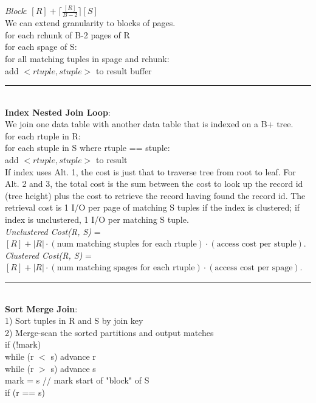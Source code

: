 \documentclass[10pt,landscape]{article}
\newcommand{\ruler}{\\\rule{\columnwidth}{0.25pt}\\}
\begin{document}
\begin{multicols*}{3}
\textit{Block}: $[R] + \lceil\frac{[R]}{B-2}\rceil[S]$\\
We can extend granularity to blocks of pages.\\
for each rchunk of B-2 pages of R\\
\-\hspace{0.5cm} for each spage of S:\\
\-\hspace{1.0cm} for all matching tuples in spage and rchunk:\\
\-\hspace{1.5cm} add $<rtuple, stuple>$ to result buffer
\ruler
\textbf{Index Nested Join Loop}:\\
We join one data table with another data table that is indexed on a B+ tree.\\
for each rtuple in R:\\
\-\hspace{0.5cm} for each stuple in S where rtuple == stuple:\\
\-\hspace{1.0cm} add $<rtuple, stuple>$ to result\\
If index uses Alt. 1, the  cost is just that to traverse tree from root to leaf. For Alt. 2 and 3, the total cost is the sum between the cost to look up the record id (tree height) plus the cost to retrieve the record having found the record id. The retrieval cost is 1 I/O per page of matching S tuples if the index is clustered; if index is unclustered, 1 I/O per matching S tuple. \\
\textit{Unclustered Cost(R, S)} = $[R] + |R| \cdot (\text{num matching stuples for each rtuple}) \cdot (\text{access cost per stuple})$.
\textit{Clustered Cost(R, S)} = $[R] + |R| \cdot (\text{num matching spages for each rtuple}) \cdot (\text{access cost per spage})$.
\ruler
\textbf{Sort Merge Join}:\\
1) Sort tuples in R and S by join key\\
2) Merge-scan the sorted partitions and output matches\\
if (!mark)\\
\-\hspace{0.5cm} while (r $<$ s) advance r \\
\-\hspace{0.5cm} while (r $>$ s) advance s \\
\-\hspace{0.5cm} mark = s // mark start of "block" of S \\
if (r == s) \\

\end{multicols*}
\end{document}
